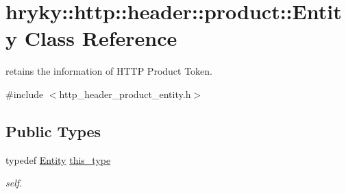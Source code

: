 \hypertarget{classhryky_1_1http_1_1header_1_1product_1_1_entity}{\section{hryky\-:\-:http\-:\-:header\-:\-:product\-:\-:Entity Class Reference}
\label{classhryky_1_1http_1_1header_1_1product_1_1_entity}
}


retains the information of H\-T\-T\-P Product Token.  




{\ttfamily \#include $<$http\-\_\-header\-\_\-product\-\_\-entity.\-h$>$}

\subsection*{Public Types}
\begin{DoxyCompactItemize}
\item 
\hypertarget{classhryky_1_1http_1_1header_1_1product_1_1_entity_a13c00263f0eaec564d5b8dad6b1fa5d6}{typedef \hyperlink{classhryky_1_1http_1_1header_1_1product_1_1_entity}{Entity} \hyperlink{classhryky_1_1http_1_1header_1_1product_1_1_entity_a13c00263f0eaec564d5b8dad6b1fa5d6}{this\-\_\-type}}\label{classhryky_1_1http_1_1header_1_1product_1_1_entity_a13c00263f0eaec564d5b8dad6b1fa5d6}

\begin{DoxyCompactList}\small\item\em self. \end{DoxyCompactList}\end{DoxyCompactItemize}
